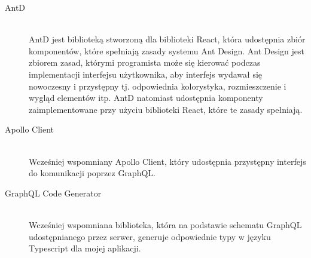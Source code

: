 \begin{description}
  \item[AntD] \hfill \\ AntD jest biblioteką stworzoną dla biblioteki React, która udostępnia zbiór komponentów, które spełniają zasady systemu Ant Design. Ant Design jest zbiorem zasad, którymi programista może się kierować podczas implementacji interfejsu użytkownika, aby interfejs wydawał się nowoczesny i przystępny tj. odpowiednia kolorystyka, rozmieszczenie i wygląd elementów itp. AntD natomiast udostępnia komponenty zaimplementowane przy użyciu biblioteki React, które te zasady spełniają.
  \item[Apollo Client] \hfill \\ Wcześniej wspomniany Apollo Client, który udostępnia przystępny interfejs do komunikacji poprzez GraphQL.
  \item[GraphQL Code Generator] \hfill \\ Wcześniej wspomniana biblioteka, która na podstawie schematu GraphQL udostępnianego przez serwer, generuje odpowiednie typy w języku Typescript dla mojej aplikacji.

\end{description}

